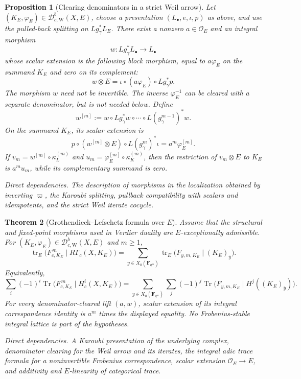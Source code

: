 \documentclass[10pt]{article}
\newtheorem{theorem}{Theorem}[section]
\newtheorem{proposition}[theorem]{Proposition}
\theoremstyle{definition}
\newcommand{\OO}{\mathcal O}
\newcommand{\DbcW}{\mathcal D^b_{c,\mathrm W}}
\newcommand{\Tr}{\operatorname{Tr}}
\newcommand{\RGammac}{R\Gamma_c}
\newcommand{\depends}[1]{\par\smallskip\noindent\textit{Direct dependencies.} #1\par}
\begin{document}
\begin{proposition}[Clearing denominators in a strict Weil arrow]
Let \((K_E,\varphi_E)\in\DbcW(X,E)\), choose a presentation
\((L_\bullet,e,\iota,p)\) as above, and use the pulled-back splitting on
\(Lg_\gamma^*L_E\).  There exist a nonzero \(a\in\OO_E\) and an integral
morphism
\[
 w:Lg_\gamma^*L_\bullet\longrightarrow L_\bullet
\]
whose scalar extension is the following block morphism, equal to
\(a\varphi_E\) on the summand \(K_E\) and zero on its complement:
\[
 w\otimes E=
 \iota\circ(a\varphi_E)\circ Lg_\gamma^*p.
\]
The morphism \(w\) need not be invertible.  The inverse
\(\varphi_E^{-1}\) can be cleared with a separate denominator, but is not
needed below.  Define
\[
 w^{[m]}:=w\circ Lg_\gamma^*w\circ\cdots\circ
 L(g_\gamma^{m-1})^*w.
\]
On the summand \(K_E\), its scalar extension is
\[
 p\circ(w^{[m]}\otimes E)\circ L(g_\gamma^m)^*\iota
 =a^m\varphi_E^{[m]}.
\]
If \(v_m=w^{[m]}\circ\kappa_{L}^{(m)}\) and
\(u_m=\varphi_E^{[m]}\circ\kappa_{K}^{(m)}\), then the restriction of
\(v_m\otimes E\) to \(K_E\) is \(a^mu_m\), while its complementary
summand is zero.
\depends{The description of morphisms in the localization obtained by
inverting \(\varpi\), the Karoubi splitting, pullback compatibility with
scalars and idempotents, and the strict Weil iterate cocycle.}
\end{proposition}

\begin{theorem}[Grothendieck--Lefschetz formula over \(E\)]
Assume that the structural and fixed-point morphisms used in Verdier
duality are \(E\)-exceptionally admissible.  For
\((K_E,\varphi_E)\in\DbcW(X,E)\) and \(m\geq1\),
\[
 \operatorname{tr}_E
 \bigl(F_{c,K_E}^{\,m}\mid\RGammac(X,K_E)\bigr)
 =
 \sum_{y\in X_0(\mathbf F_{q^m})}
 \operatorname{tr}_E
 \bigl(F_{y,m,K_E}\mid(K_E)_{\bar y}\bigr).
\]
Equivalently,
\[
 \sum_i(-1)^i\Tr
 \bigl(F_{c,K_E}^{\,m}\mid H_c^i(X,K_E)\bigr)
 =
 \sum_{y\in X_0(\mathbf F_{q^m})}
\sum_j(-1)^j\Tr
\bigl(F_{y,m,K_E}\mid H^j((K_E)_{\bar y})\bigr).
\]
For every denominator-cleared lift \((a,w)\), scalar extension of its
integral correspondence identity is \(a^m\) times the displayed equality.
No Frobenius-stable integral lattice is part of the hypotheses.
\depends{A Karoubi presentation of the underlying complex, denominator
clearing for the Weil arrow and its iterates, the integral adic trace
formula for a noninvertible Frobenius correspondence, scalar extension
\(\OO_E\to E\), and additivity and \(E\)-linearity of categorical trace.}
\end{theorem}
\end{document}
